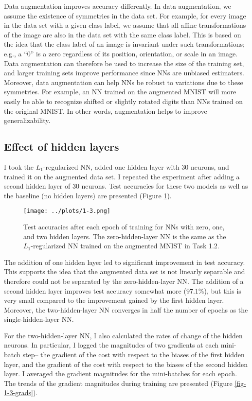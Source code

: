 \documentclass[11pt]{article}
\begin{document}
Data augmentation improves accuracy differently. In data augmentation, we assume the existence of symmetries in the data set. For example, for every image in the data set with a given class label, we assume that all affine transformations of the image are also in the data set with the same class label. This is based on the idea that the class label of an image is invariant under such transformations; e.g., a ``0'' is a zero regardless of its position, orientation, or scale in an image. Data augmentation can therefore be used to increase the size of the training set, and larger training sets improve performance since NNs are unbiased estimaters. Moreover, data augmentation can help NNs be robust to variations due to these symmetries. For example, an NN trained on the augmented MNIST will more easily be able to recognize shifted or slightly rotated digits than NNs trained on the original MNIST. In other words, augmentation helps to improve generalizability.


\subsection{Effect of hidden layers}

I took the $L_1$-regularized NN, added one hidden layer with 30 neurons, and trained it on the augmented data set. I repeated the experiment after adding a second hidden layer of 30 neurons. Test accuracies for these two models as well as the baseline (no hidden layers) are presented (Figure \ref{fig-1-3}).

\begin{figure}
\centering
\texttt{[image: ../plots/1-3.png]}
\caption{\label{fig-1-3} Test accuracies after each epoch of training for NNs with zero, one, and two hidden layers. The zero-hidden-layer NN is the same as the $L_1$-regularized NN trained on the augmented MNIST in Task 1.2.}
\end{figure}

The addition of one hidden layer led to significant improvement in test accuracy. This supports the idea that the augmented data set is not linearly separable and therefore could not be separated by the zero-hidden-layer NN. The addition of a second hidden layer improves test accuracy somewhat more (97.1\%), but this is very small compared to the improvement gained by the first hidden layer. Moreover, the two-hidden-layer NN converges in half the number of epochs as the single-hidden-layer NN.

For the two-hidden-layer NN, I also calculated the rates of change of the hidden neurons. In particular, I logged the magnitudes of two gradients at each mini-batch step-- the gradient of the cost with respect to the biases of the first hidden layer, and the gradient of the cost with respect to the biases of the second hidden layer. I averaged the gradient magnitudes for the mini-batches for each epoch. The trends of the gradient magnitudes during training are presented (Figure \ref{fig-1-3-grads}).
\end{document}
